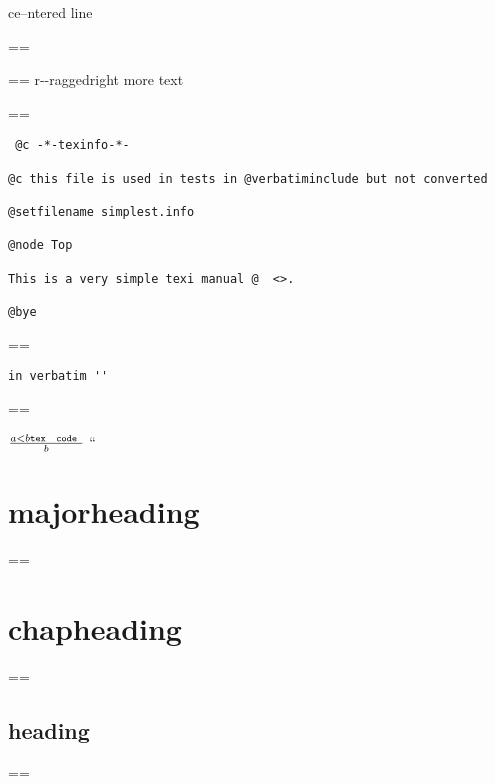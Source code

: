 \documentclass{book}
\makeatletter
\newenvironment{Texinfopreformatted}{%
  \par\GNUTobeylines\obeyspaces\frenchspacing\parskip=\z@\parindent=\z@}{}
{\catcode`\^^M=13 \gdef\GNUTobeylines{\catcode`\^^M=13 \def^^M{\null\par}}}
\newenvironment{Texinfoindented}{\begin{list}{}{}\item\relax}{\end{list}}
\newcommand{\Texinfoplaceholder}[1]{}
\newcommand{\Texinfonopagebreakheading}[2]{{\let\clearpage\relax \let\cleardoublepage\relax \let\thispagestyle\Texinfoplaceholder #1{#2}}}
\renewcommand{\_}{\Texinfounderscore\discretionary{}{}{}}
\makeatother
\begin{document}
\begin{Texinfoindented}
\begin{center}
ce--ntered line
\end{center}
\begin{Texinfopreformatted}%
\ttfamily 
\end{Texinfopreformatted}
\begin{flushleft}
\begin{Texinfopreformatted}%
\ttfamily r{-}{-}raggedright
more text
\end{Texinfopreformatted}
\end{flushleft}
\begin{Texinfopreformatted}%
\ttfamily 
\end{Texinfopreformatted}
\begin{verbatim}
 @c -*-texinfo-*-

@c this file is used in tests in @verbatiminclude but not converted

@setfilename simplest.info

@node Top

This is a very simple texi manual @  <>.

@bye
\end{verbatim}
\begin{Texinfopreformatted}%
\ttfamily 
\end{Texinfopreformatted}
\begin{verbatim}
in verbatim ''
\end{verbatim}
\begin{Texinfopreformatted}%
\ttfamily 




$\frac{a < b \texttt{tex \hbox{ code }}}{b}$ ``

\end{Texinfopreformatted}
\Texinfonopagebreakheading{\chapter*}{{majorheading}}
\begin{Texinfopreformatted}%
\ttfamily 
\end{Texinfopreformatted}
\Texinfonopagebreakheading{\chapter*}{{chapheading}}
\begin{Texinfopreformatted}%
\ttfamily 
\end{Texinfopreformatted}
\section*{{heading}}
\begin{Texinfopreformatted}%
\ttfamily 
\end{Texinfopreformatted}

\end{Texinfoindented}
\end{document}
